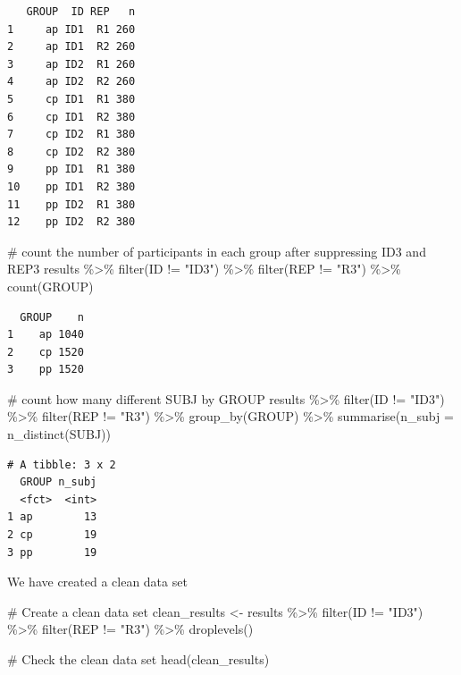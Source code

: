 \documentclass[
  letterpaper,
  DIV=11,
  numbers=noendperiod]{scrartcl}
\newenvironment{Shaded}{\begin{snugshade}}{\end{snugshade}}
\newcommand{\AttributeTok}[1]{\textcolor[rgb]{0.40,0.45,0.13}{#1}}
\newcommand{\CommentTok}[1]{\textcolor[rgb]{0.37,0.37,0.37}{#1}}
\newcommand{\FunctionTok}[1]{\textcolor[rgb]{0.28,0.35,0.67}{#1}}
\newcommand{\NormalTok}[1]{\textcolor[rgb]{0.00,0.23,0.31}{#1}}
\newcommand{\OtherTok}[1]{\textcolor[rgb]{0.00,0.23,0.31}{#1}}
\newcommand{\SpecialCharTok}[1]{\textcolor[rgb]{0.37,0.37,0.37}{#1}}
\newcommand{\StringTok}[1]{\textcolor[rgb]{0.13,0.47,0.30}{#1}}
\begin{document}
\begin{verbatim}
   GROUP  ID REP   n
1     ap ID1  R1 260
2     ap ID1  R2 260
3     ap ID2  R1 260
4     ap ID2  R2 260
5     cp ID1  R1 380
6     cp ID1  R2 380
7     cp ID2  R1 380
8     cp ID2  R2 380
9     pp ID1  R1 380
10    pp ID1  R2 380
11    pp ID2  R1 380
12    pp ID2  R2 380
\end{verbatim}

\begin{Shaded}
\begin{Highlighting}[]
\CommentTok{\# count the number of participants in each group after suppressing ID3 and REP3}
\NormalTok{results }\SpecialCharTok{\%\textgreater{}\%}
  \FunctionTok{filter}\NormalTok{(ID }\SpecialCharTok{!=} \StringTok{"ID3"}\NormalTok{) }\SpecialCharTok{\%\textgreater{}\%}
  \FunctionTok{filter}\NormalTok{(REP }\SpecialCharTok{!=} \StringTok{"R3"}\NormalTok{) }\SpecialCharTok{\%\textgreater{}\%}
  \FunctionTok{count}\NormalTok{(GROUP) }
\end{Highlighting}
\end{Shaded}

\begin{verbatim}
  GROUP    n
1    ap 1040
2    cp 1520
3    pp 1520
\end{verbatim}

\begin{Shaded}
\begin{Highlighting}[]
\CommentTok{\# count how many different SUBJ by GROUP}
\NormalTok{results }\SpecialCharTok{\%\textgreater{}\%}
  \FunctionTok{filter}\NormalTok{(ID }\SpecialCharTok{!=} \StringTok{"ID3"}\NormalTok{) }\SpecialCharTok{\%\textgreater{}\%}
  \FunctionTok{filter}\NormalTok{(REP }\SpecialCharTok{!=} \StringTok{"R3"}\NormalTok{) }\SpecialCharTok{\%\textgreater{}\%}
  \FunctionTok{group\_by}\NormalTok{(GROUP) }\SpecialCharTok{\%\textgreater{}\%}
  \FunctionTok{summarise}\NormalTok{(}\AttributeTok{n\_subj =} \FunctionTok{n\_distinct}\NormalTok{(SUBJ))}
\end{Highlighting}
\end{Shaded}

\begin{verbatim}
# A tibble: 3 x 2
  GROUP n_subj
  <fct>  <int>
1 ap        13
2 cp        19
3 pp        19
\end{verbatim}

We have created a clean data set

\begin{Shaded}
\begin{Highlighting}[]
\CommentTok{\# Create a clean data set}
\NormalTok{clean\_results }\OtherTok{\textless{}{-}}\NormalTok{ results }\SpecialCharTok{\%\textgreater{}\%}
  \FunctionTok{filter}\NormalTok{(ID }\SpecialCharTok{!=} \StringTok{"ID3"}\NormalTok{) }\SpecialCharTok{\%\textgreater{}\%}
  \FunctionTok{filter}\NormalTok{(REP }\SpecialCharTok{!=} \StringTok{"R3"}\NormalTok{) }\SpecialCharTok{\%\textgreater{}\%}
  \FunctionTok{droplevels}\NormalTok{()}

\CommentTok{\# Check the clean data set}
\FunctionTok{head}\NormalTok{(clean\_results)}
\end{Highlighting}
\end{Shaded}
\end{document}

